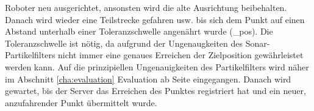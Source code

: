 Roboter neu ausgerichtet, ansonsten wird die alte Ausrichtung beibehalten.
Danach wird wieder eine Teilstrecke gefahren usw. bis sich dem Punkt auf
einen Abstand unterhalb einer Toleranzschwelle angenährt wurde
(\lstinlindelta\_pos). 
Die Toleranzschwelle ist nötig, da aufgrund der Ungenaugkeiten des
Sonar-Partikelfilters nicht immer eine genaues Erreichen der
Zielposition gewährleistet werden kann.  Auf die prinzipiellen
Ungenauigkeiten des Partikelfilters wird näher im Abschnitt
\ref{cha:evaluation} Evaluation
ab Seite \pageref{cha:evaluation} eingegangen. 
Danach wird gewartet, bis der Server das Erreichen des Punktes registriert
hat und ein neuer, anzufahrender Punkt übermittelt wurde.






